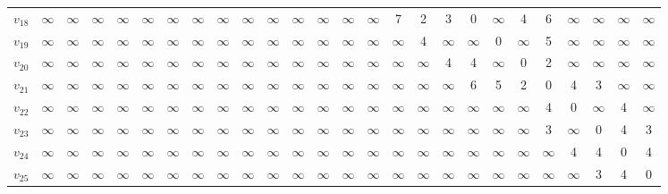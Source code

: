 \begin{tabular}{c|ccccccccccccccccccccccccc}
$v_{18}$ & $\infty$ & $\infty$ & $\infty$ & $\infty$ & $\infty$ & $\infty$ & $\infty$ & $\infty$ & $\infty$ & $\infty$ & $\infty$ & $\infty$ & $\infty$ & $\infty$ & 7 & 2 & 3 & 0 & $\infty$ & 4 & 6 & $\infty$ & $\infty$ & $\infty$ & $\infty$ \\
$v_{19}$ & $\infty$ & $\infty$ & $\infty$ & $\infty$ & $\infty$ & $\infty$ & $\infty$ & $\infty$ & $\infty$ & $\infty$ & $\infty$ & $\infty$ & $\infty$ & $\infty$ & $\infty$ & 4 & $\infty$ & $\infty$ & 0 & $\infty$ & 5 & $\infty$ & $\infty$ & $\infty$ & $\infty$ \\
$v_{20}$ & $\infty$ & $\infty$ & $\infty$ & $\infty$ & $\infty$ & $\infty$ & $\infty$ & $\infty$ & $\infty$ & $\infty$ & $\infty$ & $\infty$ & $\infty$ & $\infty$ & $\infty$ & $\infty$ & 4 & 4 & $\infty$ & 0 & 2 & $\infty$ & $\infty$ & $\infty$ & $\infty$ \\
$v_{21}$ & $\infty$ & $\infty$ & $\infty$ & $\infty$ & $\infty$ & $\infty$ & $\infty$ & $\infty$ & $\infty$ & $\infty$ & $\infty$ & $\infty$ & $\infty$ & $\infty$ & $\infty$ & $\infty$ & $\infty$ & 6 & 5 & 2 & 0 & 4 & 3 & $\infty$ & $\infty$ \\
$v_{22}$ & $\infty$ & $\infty$ & $\infty$ & $\infty$ & $\infty$ & $\infty$ & $\infty$ & $\infty$ & $\infty$ & $\infty$ & $\infty$ & $\infty$ & $\infty$ & $\infty$ & $\infty$ & $\infty$ & $\infty$ & $\infty$ & $\infty$ & $\infty$ & 4 & 0 & $\infty$ & 4 & $\infty$ \\
$v_{23}$ & $\infty$ & $\infty$ & $\infty$ & $\infty$ & $\infty$ & $\infty$ & $\infty$ & $\infty$ & $\infty$ & $\infty$ & $\infty$ & $\infty$ & $\infty$ & $\infty$ & $\infty$ & $\infty$ & $\infty$ & $\infty$ & $\infty$ & $\infty$ & 3 & $\infty$ & 0 & 4 & 3 \\
$v_{24}$ & $\infty$ & $\infty$ & $\infty$ & $\infty$ & $\infty$ & $\infty$ & $\infty$ & $\infty$ & $\infty$ & $\infty$ & $\infty$ & $\infty$ & $\infty$ & $\infty$ & $\infty$ & $\infty$ & $\infty$ & $\infty$ & $\infty$ & $\infty$ & $\infty$ & 4 & 4 & 0 & 4 \\
$v_{25}$ & $\infty$ & $\infty$ & $\infty$ & $\infty$ & $\infty$ & $\infty$ & $\infty$ & $\infty$ & $\infty$ & $\infty$ & $\infty$ & $\infty$ & $\infty$ & $\infty$ & $\infty$ & $\infty$ & $\infty$ & $\infty$ & $\infty$ & $\infty$ & $\infty$ & $\infty$ & 3 & 4 & 0 \\
\end{tabular}
